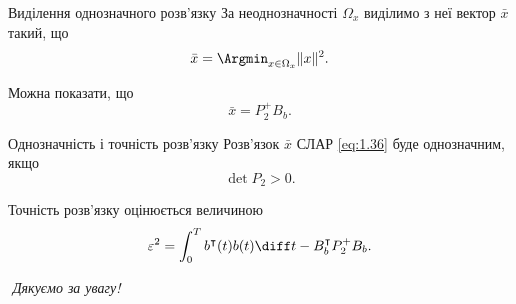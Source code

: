 \begin{mframe}{Виділення однозначного розв'язку}
    За неоднозначності $\Omega_x$ виділимо з неї вектор $\bar x$ такий, що
    \begin{equation}
        \label{eq:1.42}
        \bar x = \Argmin_{x \in \Omega_x} \|x\|^2.
    \end{equation}
    
    Можна показати, що
    \begin{equation}
        \label{eq:1.46}
        \bar x = P_2^+ B_b.
    \end{equation}
\end{mframe}

\begin{mframe}{Однозначність і точність розв'язку}
    Розв'язок $\bar x$ СЛАР \eqref{eq:1.36} буде однозначним, якщо
    \begin{equation}
        \label{eq:1.48}
        \det P_2 > 0.
    \end{equation}

    Точність розв'язку оцінюється величиною
    \begin{equation}
        \label{eq:1.50}
        \varepsilon^2 = \int_0^T b^\intercal(t) b(t) \diff t - 
        B_b^\intercal P_2^+ B_b.
    \end{equation}
\end{mframe}

\begin{frame}{$\left.\right.$}
  \centering \Huge
  \emph{Дякуємо за увагу!}
\end{frame}
